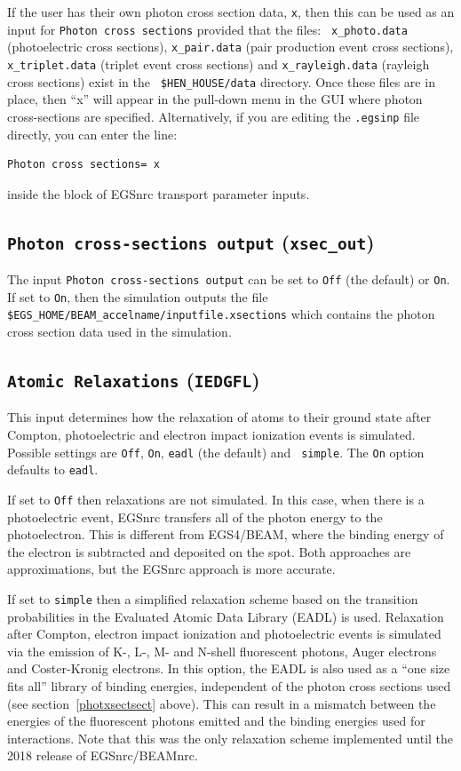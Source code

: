 \documentclass[12pt,twoside]{article}
\begin{document}
If the user has their own photon cross section data, {\tt x}, then this can be
used as an input for {\tt Photon cross sections} provided that the files: {\tt
x\_photo.data} (photoelectric cross sections), {\tt x\_pair.data} (pair
production event cross sections), {\tt x\_triplet.data} (triplet event cross
sections) and {\tt x\_rayleigh.data} (rayleigh cross sections) exist in the {\tt
\$HEN\_HOUSE/data} directory. Once these files are in place, then ``x'' will
appear in the pull-down menu in the GUI where photon cross-sections are
specified.  Alternatively, if you are editing the {\tt .egsinp} file directly,
you can enter the line:
\begin{verbatim}
Photon cross sections= x
\end{verbatim}
inside the block of EGSnrc transport parameter inputs.

\subsection{{\tt Photon cross-sections output} ({\tt xsec\_out})}

The input {\tt Photon cross-sections output} can be set to {\tt Off} (the
default) or {\tt On}. If set to {\tt On}, then the simulation outputs the file
{\tt \$EGS\_HOME/BEAM\_accelname/inputfile.xsections} which contains the photon
cross section data used in the simulation.

\subsection{ {\tt Atomic Relaxations} ({\tt IEDGFL})}

This input determines how the relaxation of atoms to their ground state after
Compton, photoelectric and electron impact ionization events is simulated.
Possible settings are {\tt Off}, {\tt On}, {\tt eadl} (the default) and {\tt
simple}. The {\tt On} option defaults to {\tt eadl}.

If set to {\tt Off} then relaxations are not simulated.  In this case, when
there is a photoelectric event, EGSnrc transfers all of the photon energy to the
photoelectron.  This is different from EGS4/BEAM, where the binding energy of
the electron is subtracted and deposited on the spot.  Both approaches are
approximations, but the EGSnrc approach is more accurate.

If set to {\tt simple} then a simplified relaxation scheme based on the
transition probabilities in the Evaluated Atomic Data Library (EADL) is used.
Relaxation after Compton, electron impact ionization and photoelectric events is
simulated via the emission of K-, L-, M- and N-shell fluorescent photons, Auger
electrons and Coster-Kronig electrons.  In this option, the EADL is also used as
a ``one size fits all'' library of binding energies, independent of the photon
cross sections used (see section~\ref{photxsectsect} above).  This can result in
a mismatch between the energies of the fluorescent photons emitted and the
binding energies used for interactions.  Note that this was the only relaxation
scheme implemented until the 2018 release of EGSnrc/BEAMnrc.
\end{document}
